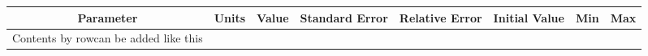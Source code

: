 \begin{tabular}[c]{| c | c | c | c | c | c | c | c |} 
\hline 
    \textbf{Parameter} & \textbf{Units} & \textbf{Value} & \textbf{Standard Error} & \textbf{Relative Error} & \textbf{Initial Value} & \textbf{Min} & \textbf{Max} \\ \hline 
Contents by rowcan be added like this \\ \hline 
\end{tabular} 

